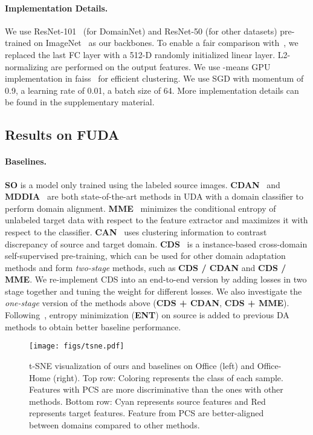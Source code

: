 \documentclass[final]{cvpr}
\begin{document}
\paragraph{Implementation Details.}
We use ResNet-101~\cite{he2016deep} (for DomainNet) and ResNet-50 (for other datasets) pre-trained on ImageNet~\cite{russakovsky2015imagenet} as our backbones. To enable a fair comparison with~\cite{kim2020cross}, we replaced the last FC layer with a 512-D randomly initialized linear layer. L2-normalizing are performed on the output features. We use -means GPU implementation in faiss~\cite{faiss} for efficient clustering. We use SGD with momentum of 0.9, a learning rate of 0.01, a batch size of 64. More implementation details can be found in the supplementary material.



\subsection{Results on FUDA}


\paragraph{Baselines.}
\textbf{SO} is a model only trained using the labeled source images. \textbf{CDAN}~\cite{long2018conditional} and \textbf{MDDIA}~\cite{jiang2020implicit} are both state-of-the-art methods in UDA with a domain classifier to perform domain alignment. \textbf{MME}~\cite{saito2019semi} minimizes the conditional entropy of unlabeled target data with respect to the feature extractor and maximizes it with respect to the classifier. \textbf{CAN}~\cite{kang2019contrastive} uses clustering information to contrast discrepancy of source and target domain. \textbf{CDS}~\cite{kim2020cross} is a instance-based cross-domain self-supervised pre-training, which can be used for other domain adaptation methods and form \textit{two-stage} methods, such as \textbf{CDS / CDAN} and \textbf{CDS / MME}. We re-implement CDS into an end-to-end version by adding losses in two stage together and tuning the weight for different losses. We also investigate the \textit{one-stage} version of the methods above (\textbf{CDS + CDAN}, \textbf{CDS + MME}). Following~\cite{kim2020cross}, entropy minimization (\textbf{ENT}) on source is added to previous DA methods to obtain better baseline performance. 




\begin{figure*}[!ht]
 \centering
 \texttt{[image: figs/tsne.pdf]}
 \caption{t-SNE visualization of ours and baselines on Office (left) and Office-Home (right). Top row: Coloring represents the class of each sample. Features with PCS are more discriminative than the ones with other methods. Bottom row: \textcolor{my_cyan}{Cyan} represents source features and \textcolor{myMaroon}{Red} represents target features. Feature from PCS are better-aligned between domains compared to other methods. 
 }
 \label{fig:tsne}
\end{figure*}
\end{document}
